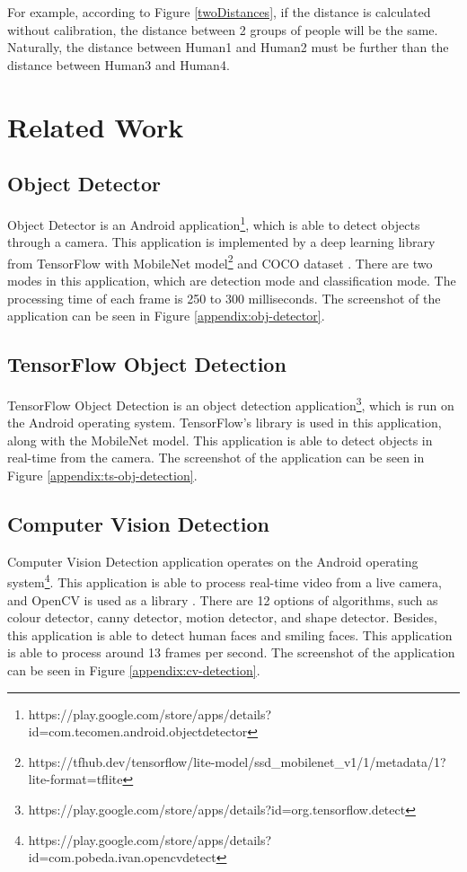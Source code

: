         For example, according to Figure \ref{twoDistances},
        if the distance is calculated without calibration, the distance between 2 groups of people will be the same.
        Naturally, the distance between Human1 and Human2 must be further than the distance between Human3 and Human4.

    \section{Related Work}
        \subsection{Object Detector}
            Object Detector is an Android application\footnote{https://play.google.com/store/apps/details?id=com.tecomen.android.objectdetector},
            which is able to detect objects through a camera.
            This application is implemented by a deep learning library from TensorFlow \cite{tensorflow2015-whitepaper} with
            MobileNet model\footnote{https://tfhub.dev/tensorflow/lite-model/ssd\_mobilenet\_v1/1/metadata/1?lite-format=tflite} \cite{mobilenet} \cite{ssd} and COCO dataset \cite{coco-dataset}. There are two modes in this application,
            which are detection mode and classification mode.
            The processing time of each frame is 250 to 300 milliseconds.
            The screenshot of the application can be seen in Figure \ref{appendix:obj-detector}.

        \subsection{TensorFlow Object Detection}
            TensorFlow Object Detection is an object detection application\footnote{https://play.google.com/store/apps/details?id=org.tensorflow.detect},
            which is run on the Android operating system.
            TensorFlow's library is used in this application, along with the MobileNet model.
            This application is able to detect objects in real-time from the camera.
            The screenshot of the application can be seen in Figure \ref{appendix:ts-obj-detection}.


        \subsection{Computer Vision Detection}
            Computer Vision Detection application operates on the Android operating system\footnote{https://play.google.com/store/apps/details?id=com.pobeda.ivan.opencvdetect}.
            This application is able to process real-time video from a live camera,
            and OpenCV is used as a library \cite{opencv_library}.
            There are 12 options of algorithms, such as colour detector, canny detector, motion detector, and shape detector.
            Besides, this application is able to detect human faces and smiling faces.
            This application is able to process around 13 frames per second.
            The screenshot of the application can be seen in Figure \ref{appendix:cv-detection}.


